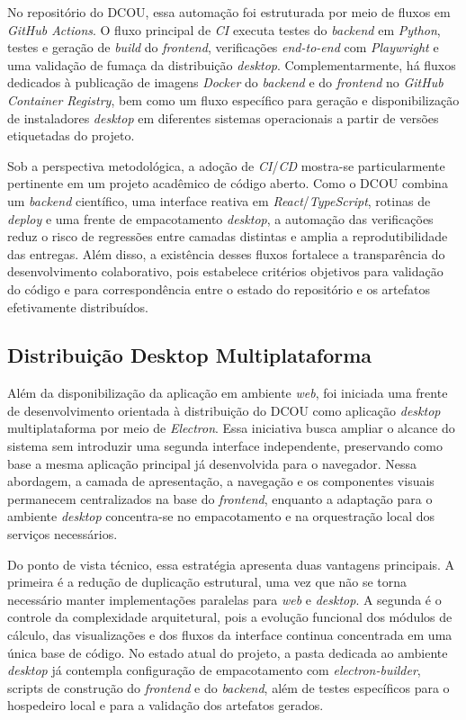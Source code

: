 No repositório do DCOU, essa automação foi estruturada por meio de fluxos em \textit{GitHub Actions}. O fluxo principal de \textit{CI} executa testes do \textit{backend} em \textit{Python}, testes e geração de \textit{build} do \textit{frontend}, verificações \textit{end-to-end} com \textit{Playwright} e uma validação de fumaça da distribuição \textit{desktop}. Complementarmente, há fluxos dedicados à publicação de imagens \textit{Docker} do \textit{backend} e do \textit{frontend} no \textit{GitHub Container Registry}, bem como um fluxo específico para geração e disponibilização de instaladores \textit{desktop} em diferentes sistemas operacionais a partir de versões etiquetadas do projeto.

Sob a perspectiva metodológica, a adoção de \textit{CI}/\textit{CD} mostra-se particularmente pertinente em um projeto acadêmico de código aberto. Como o DCOU combina um \textit{backend} científico, uma interface reativa em \textit{React}/\textit{TypeScript}, rotinas de \textit{deploy} e uma frente de empacotamento \textit{desktop}, a automação das verificações reduz o risco de regressões entre camadas distintas e amplia a reprodutibilidade das entregas. Além disso, a existência desses fluxos fortalece a transparência do desenvolvimento colaborativo, pois estabelece critérios objetivos para validação do código e para correspondência entre o estado do repositório e os artefatos efetivamente distribuídos.

\subsection{Distribuição Desktop Multiplataforma}

Além da disponibilização da aplicação em ambiente \textit{web}, foi iniciada uma frente de desenvolvimento orientada à distribuição do DCOU como aplicação \textit{desktop} multiplataforma por meio de \textit{Electron}. Essa iniciativa busca ampliar o alcance do sistema sem introduzir uma segunda interface independente, preservando como base a mesma aplicação principal já desenvolvida para o navegador. Nessa abordagem, a camada de apresentação, a navegação e os componentes visuais permanecem centralizados na base do \textit{frontend}, enquanto a adaptação para o ambiente \textit{desktop} concentra-se no empacotamento e na orquestração local dos serviços necessários.

Do ponto de vista técnico, essa estratégia apresenta duas vantagens principais. A primeira é a redução de duplicação estrutural, uma vez que não se torna necessário manter implementações paralelas para \textit{web} e \textit{desktop}. A segunda é o controle da complexidade arquitetural, pois a evolução funcional dos módulos de cálculo, das visualizações e dos fluxos da interface continua concentrada em uma única base de código. No estado atual do projeto, a pasta dedicada ao ambiente \textit{desktop} já contempla configuração de empacotamento com \textit{electron-builder}, scripts de construção do \textit{frontend} e do \textit{backend}, além de testes específicos para o hospedeiro local e para a validação dos artefatos gerados.

